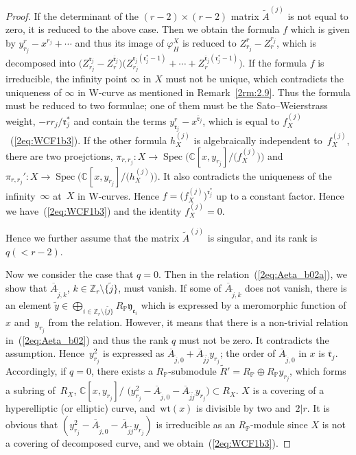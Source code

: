 \documentclass[10pt,a4paper]{amsart}
\def\CC{{\mathbb C}}
\def\ZZ{{\mathbb Z}}
\def\PP{{\mathbb P}}
\def\fe{{\mathfrak e}}
\def\fr{{\mathfrak r}}
\def\fy{{\mathfrak y}}
\def\tA{{\widetilde A}}
\def\tR{{\widetilde R}}
\def\tR{{\widetilde R}}
\def\tj{{\widetilde j}}
\def\ty{{\widetilde y}}
\def\BA{{\overline A}}
\def\Bfr{{\overline{\mathfrak r}}}
\def\Spec{\operatorname{Spec}}
\def\wt{{\mathrm {wt}}}
\numberwithin{equation}{section}
\begin{document}
\begin{proof}
If the determinant of the $(r-2)\times (r-2)$ matrix $\tA^{(j)}$ is not equal to zero, it is reduced to the above case.
Then we obtain the formula $f$ which is given by $y_{r_j}^r - x^{r_j} + \cdots$ and thus its image of $\varphi_H^X$ is reduced to $Z_{r_j}^r - Z_r^{r_j}$, which is decomposed into $\big(Z_{r_j}^{\fr_j} - Z_r^{\Bfr_j}\big)\big(Z_{r_j}^{\fr_j(\fr_j^*-1)}+\cdots+ Z_r^{\Bfr_j(\fr_j^*-1)}\big)$.
If the formula $f$ is irreducible, the infinity point $\infty$ in $X$ must not be unique, which contradicts the uniqueness of $\infty$ in W-curve as mentioned in Remark~\ref{2rm:2.9}.
Thus the formula must be reduced to two formulae; one of them must be the Sato--Weierstrass weight, $-r r_j/\fr_j^*$ and contain the terms $y_{\fr_j}^r - x^{\Bfr_j}$, which is equal to $f_X^{(j)}$~(\ref{2eq:WCF1b3}).
If the other formula $h_X^{(j)}$ is algebraically independent to~$f_X^{(j)}$, there are two proejctions, $\pi_{r, r_j}\colon X\to \Spec \big(\CC[x,y_{r_j}]/\big(f_X^{(j)}\big)\big)$ and $\pi_{r, r_j}'\colon X\to \Spec \big(\CC[x,y_{r_j}]/\big(h_X^{(j)}\big)\big)$.
It also contradicts the uniqueness of the infinity~$\infty$ at~$X$ in W-curves. Hence $f=\big(f_X^{(j)}\big)^{\fr_j^*}$ up to a constant factor. Hence we have~(\ref{2eq:WCF1b3}) and the identity $f_X^{(j)}=0$.

Hence we further assume that the matrix $\tA^{(j)}$ is singular, and its rank is $q(<r-2)$.

Now we consider the case that $q=0$.
Then in the relation~(\ref{2eq:Aeta_b02a}), we show that $\BA_{\tj,k}$, $k\in \ZZ_r\setminus\big\{\tj\big\}$, must vanish.
If some of $\BA_{\tj,k}$ does not vanish, there is an element $\ty \in \bigoplus_{i \in \ZZ_r\setminus\{\tj\}}R_\PP \fy_{\fe_i}$ which is expressed by a meromorphic function of~$x$ and~$y_{r_j}$ from the relation.
However, it means that there is a non-trivial relation in~(\ref{2eq:Aeta_b02}) and thus the rank $q$ must not be zero. It contradicts the assumption.
Hence~$y_{r_j}^2$ is expressed as $\BA_{\tj,0}+\BA_{\tj\tj}y_{r_j}$; the order of $\BA_{\tj,0}$ in $x$ is $\Bfr_j$.
Accordingly, if $q = 0$, there exists a $R_\PP$-submodule $\tR'=R_\PP \oplus R_\PP y_{r_j}$, which forms a subring of~$R_X$, $\CC[x, y_{r_j}]/$ $\big(y_{r_j}^2-\BA_{\tj,0}-\BA_{\tj\tj}y_{r_j}\big)\subset R_X$.
$X$ is a covering of a hyperelliptic (or elliptic) curve, and~$\wt(x)$ is divisible by two and~$2|r$.
It is obvious that $(y_{r_j}^2-\BA_{\tj,0}-\BA_{\tj\tj}y_{r_j})$ is irreducible as an $R_\PP$-module since $X$ is not a covering of decomposed curve, and we obtain~(\ref{2eq:WCF1b3}).


\end{proof}
\end{document}
